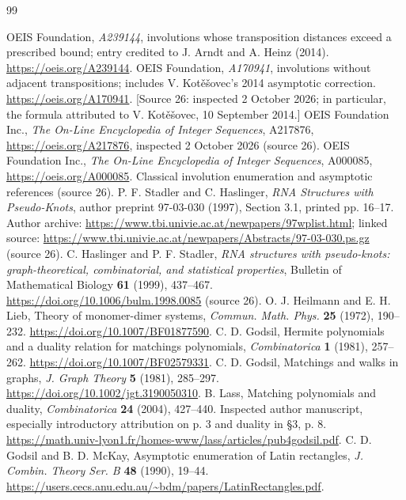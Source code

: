 \documentclass[11pt,letterpaper]{article}
\theoremstyle{remark}\newtheorem{remark}[theorem]{Remark}
\begin{document}
\begin{thebibliography}{99}\raggedright
{} OEIS Foundation, \emph{A239144}, involutions whose transposition distances exceed a prescribed bound; entry credited to J. Arndt and A. Heinz (2014). \url{https://oeis.org/A239144}.
 OEIS Foundation, \emph{A170941}, involutions without adjacent transpositions; includes V. Kot\v{e}\v{s}ovec's 2014 asymptotic correction. \url{https://oeis.org/A170941}. [Source 26: inspected 2 October 2026; in particular, the formula attributed to V. Kot\v{e}\v{s}ovec, 10 September 2014.]
 OEIS Foundation Inc., \emph{The On-Line Encyclopedia of Integer Sequences}, A217876, \url{https://oeis.org/A217876}, inspected 2 October 2026 (source 26).
 OEIS Foundation Inc., \emph{The On-Line Encyclopedia of Integer Sequences}, A000085, \url{https://oeis.org/A000085}. Classical involution enumeration and asymptotic references (source 26).
 P. F. Stadler and C. Haslinger, \emph{RNA Structures with Pseudo-Knots}, author preprint 97-03-030 (1997), Section 3.1, printed pp. 16--17. Author archive: \url{https://www.tbi.univie.ac.at/newpapers/97wplist.html}; linked source: \url{https://www.tbi.univie.ac.at/newpapers/Abstracts/97-03-030.ps.gz} (source 26).
 C. Haslinger and P. F. Stadler, \emph{RNA structures with pseudo-knots: graph-theoretical, combinatorial, and statistical properties}, Bulletin of Mathematical Biology \textbf{61} (1999), 437--467. \url{https://doi.org/10.1006/bulm.1998.0085} (source 26).
 O. J. Heilmann and E. H. Lieb, Theory of monomer-dimer systems, \emph{Commun. Math. Phys.} \textbf{25} (1972), 190--232. \url{https://doi.org/10.1007/BF01877590}.
 C. D. Godsil, Hermite polynomials and a duality relation for matchings polynomials, \emph{Combinatorica} \textbf{1} (1981), 257--262. \url{https://doi.org/10.1007/BF02579331}.
 C. D. Godsil, Matchings and walks in graphs, \emph{J. Graph Theory} \textbf{5} (1981), 285--297. \url{https://doi.org/10.1002/jgt.3190050310}.
 B. Lass, Matching polynomials and duality, \emph{Combinatorica} \textbf{24} (2004), 427--440. Inspected author manuscript, especially introductory attribution on p. 3 and duality in \S3, p. 8. \url{https://math.univ-lyon1.fr/homes-www/lass/articles/pub4godsil.pdf}.
 C. D. Godsil and B. D. McKay, Asymptotic enumeration of Latin rectangles, \emph{J. Combin. Theory Ser. B} \textbf{48} (1990), 19--44. \url{https://users.cecs.anu.edu.au/~bdm/papers/LatinRectangles.pdf}.

\end{thebibliography}
\end{document}
